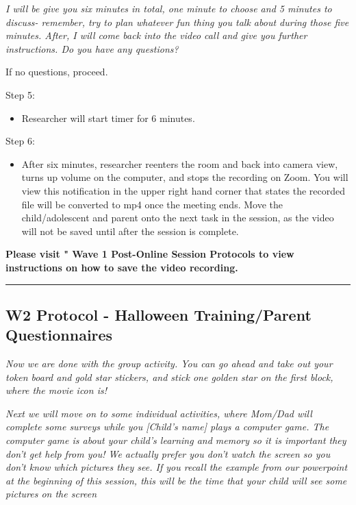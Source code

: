 \documentclass[]{book}
\providecommand{\tightlist}{%
  \setlength{\itemsep}{0pt}\setlength{\parskip}{0pt}}
\begin{document}
\emph{I will be give you six minutes in total, one minute to choose and 5 minutes to discuss- remember, try to plan whatever fun thing you talk about during those five minutes. After, I will come back into the video call and give you further instructions. Do you have any questions?}

If no questions, proceed.

Step 5:

\begin{itemize}
\tightlist
\item
  Researcher will start timer for 6 minutes.
\end{itemize}

Step 6:

\begin{itemize}
\tightlist
\item
  After six minutes, researcher reenters the room and back into camera view, turns up volume on the computer, and stops the recording on Zoom. You will view this notification in the upper right hand corner that states the recorded file will be converted to mp4 once the meeting ends. Move the child/adolescent and parent onto the next task in the session, as the video will not be saved until after the session is complete.
\end{itemize}

\textbf{Please visit " Wave 1 Post-Online Session Protocols to view instructions on how to save the video recording.}

\begin{center}\rule{0.5\linewidth}{0.5pt}\end{center}

\hypertarget{w2-protocol---halloween-trainingparent-questionnaires}{%
\subsection{W2 Protocol - Halloween Training/Parent Questionnaires}\label{w2-protocol---halloween-trainingparent-questionnaires}}

\emph{Now we are done with the group activity. You can go ahead and take out your token board and gold star stickers, and stick one golden star on the first block, where the movie icon is!}

\emph{Next we will move on to some individual activities, where Mom/Dad will complete some surveys while you {[}Child's name{]} plays a computer game. The computer game is about your child's learning and memory so it is important they don't get help from you! We actually prefer you don't watch the screen so you don't know which pictures they see. If you recall the example from our powerpoint at the beginning of this session, this will be the time that your child will see some pictures on the screen}
\end{document}
